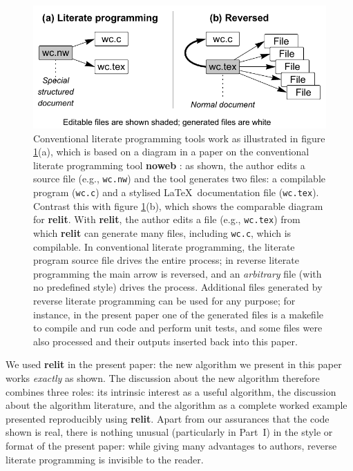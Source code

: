 \documentclass[preprint,times]{elsarticle}
\def\new#1{#1}
\def\name#1{\textbf{#1}}
\begin{document}
\begin{figure}
\begin{center}
\noindent\includegraphics[width=4.9in]{figures/reversed.pdf}
\end{center}
\caption{\new{Conventional literate programming tools work as illustrated in figure \ref{fig:reversed}(a), which is based on a diagram in a paper on the conventional literate programming tool \name{noweb} \cite{noweb}: as shown, the author edits a source file (e.g., \texttt{wc.nw}) and the tool generates two files: a compilable program (\texttt{wc.c}) and a stylised \LaTeX\ documentation file (\texttt{wc.tex}). Contrast this with figure \ref{fig:reversed}(b), which shows the comparable diagram for \name{relit}. With \name{relit}, the author edits a file (e.g., \texttt{wc.tex}) from which \name{relit} can generate many files, including \texttt{wc.c}, which is compilable. In conventional literate programming, the literate program source file drives the entire process; in reverse literate programming the main arrow is reversed, and an \emph{arbitrary\/} file (with no predefined style) drives the process. Additional files generated by reverse literate programming can be used for any purpose; for instance, in the present paper one of the generated files is a makefile to compile and run code and perform unit tests, and some files were also processed and their outputs inserted back into this paper. }}
\label{fig:reversed}
\end{figure}

We used \name{relit} in the present paper: the new algorithm we present in this paper works \emph{exactly\/} as shown. The discussion about the new algorithm therefore combines three roles: its intrinsic interest as a useful algorithm, the discussion about the algorithm literature, and the algorithm as a complete worked example presented reproducibly using \name{relit}. \new{Apart from our assurances that the code shown is real, there is nothing unusual (particularly in Part~I) in the style or format of the present paper: while giving many advantages to authors, reverse literate programming is invisible to the reader.}
\end{document}
